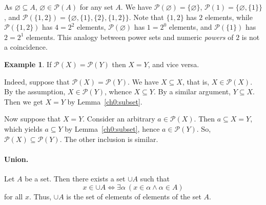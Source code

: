 \documentclass[12pt,notitlepage]{article}
\theoremstyle{plain}
\theoremstyle{definition}
\newtheorem{exm}[thm]{Example}
\theoremstyle{plain}
\newcommand{\sbs}{\subseteq}
\newcommand{\void}{\varnothing}
\newcommand{\mP}{\mathcal{P}}
\newcommand{\1}{\mathbf{1}}
\newcommand{\0}{\mathbf{0}}
\newcommand{\mcomm}[1]{}
\begin{document}
As $\void \sbs A$, $\void \in \mP(A)$ for any set $A$. We have $\mP(\void) = \{\void\}$, $\mP(1) = \{\void, \{1\} \}$, and $\mP(\{1,2\}) = \{\void, \{1\}, \{2\}, \{1,2\}\}$. Note that $\{1,2\}$ has $2$ elements, while $\mP(\{1,2\})$ has $4 = 2^2$ elements, $\mP(\void)$ has $1 = 2^0$ elements, and $\mP(\{1\})$ has $2 = 2^1$ elements. This analogy between power sets and numeric \emph{powers} of $2$ is not a coincidence.

\mcomm{Clearly, every formal proof that the set $\{1,2\}$ has just those subsets as specified above boils down to an exhaustive search argument (for one must at least write all the subsets down). It might be beneficial to draw the tree of all subsets for a small size example, yet we skip such formal proofs in general.}

\begin{exm}
If $\mP(X) = \mP(Y)$ then $X  = Y$, and vice versa.

Indeed, suppose that $\mP(X) = \mP(Y)$. We have $X \sbs X$, that is, $X \in \mP(X)$. By the assumption, $X \in \mP(Y)$, whence $X \sbs Y$.  By a similar argument, $Y \sbs X$. Then we get $X = Y$ by Lemma~\ref{ch0:subset}.

Now suppose that $X = Y$. Consider an arbitrary $a \in \mP(X)$. Then $a \sbs X = Y$, which yields $a \sbs Y$ by Lemma~\ref{ch0:subset}, hence $a \in \mP(Y)$. So, $\mP(X) \sbs \mP(Y)$. The other inclusion is similar.
\end{exm}

\paragraph{Union.} Let $A$ be a set. Then there exists a set $\cup A$ such that
$$x \in \cup A \iff \exists \alpha\ (x \in \alpha \wedge \alpha \in A)$$
for all $x$. Thus, $\cup A$ is the set of elements of elements of the set $A$.

\mcomm{This concept is most likely unknown for most students; so they may need some time to grasp it. In our practice, drawing (potentially) infinite families of planar figures and highlighting their unions with color prove beneficial.
\medskip\\
Moreover, depending on the audience, it might be better to replace this general principle by a weaker version:
\emph{For every sets $A$ and $B$, there exists a set $A \cup B$ such that
$x \in A \cup B \iff x \in A \vee x \in B$ for all $x$}. This version is sufficient for most of this Course's developments. Countable unions pose a noticeable exception; they are yet neither frequent, nor crucial, nor hard to explain as most students will consider them ``natural'' and ``logical''.}
\end{document}
